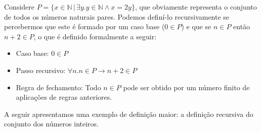 \begin{Example}
Considere  $P=\{x\in\mathbb{N}\,|\,\exists
y.y\in\mathbb{N}\land x = 2y\}$, que obviamente representa o conjunto
de todos os números naturais pares. Podemos definí-lo recursivamente
se percebermos que este é formado por um caso base ($0\in P$) e que se
$n\in P$ então $n + 2\in P$, o que é definido formalmente a seguir:
\begin{itemize}
  \item Caso base: $0\in P$
  \item Passo recursivo: $\forall n. n\in P \to n + 2 \in P$
  \item Regra de fechamento: Todo $n\in P$ pode ser obtido por um
    número finito de aplicações de regras anteriores.
\end{itemize}
\end{Example}

A seguir apresentamos uma exemplo de definição maior: a
definição recursiva do conjunto dos números inteiros.

